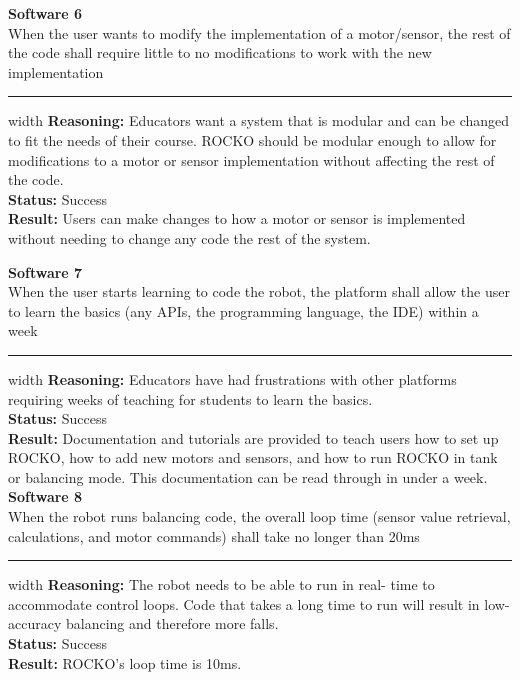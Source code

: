 \documentclass{fank1basedocument}
\begin{document}
{\large \textbf{Software 6}}\\
When the user wants to modify the implementation of a motor/sensor, the rest of the code shall require little to no modifications to work with the new implementation
\hrule width \linewidth
\vspace{2px}
\textbf{Reasoning:} Educators want a system that is modular and can be changed to fit the needs of their course. ROCKO should be modular enough to allow for modifications to a motor or sensor implementation without affecting the rest of the code.\\
\textbf{Status:} \color{ForestGreen}Success\color{black}\\
\textbf{Result:} Users can make changes to how a motor or sensor is implemented without needing to change any code the rest of the system.\\

\pagebreak

{\large \textbf{Software 7}}\\
When the user starts learning to code the robot, the platform shall allow the user to learn the basics (any APIs, the programming language, the IDE) within a week
\hrule width \linewidth
\vspace{2px}
\textbf{Reasoning:} Educators have had frustrations with other platforms requiring weeks of teaching for students to learn the basics.\\
\textbf{Status:} \color{ForestGreen}Success\color{black}\\
\textbf{Result:} Documentation and tutorials are provided to teach users how to set up ROCKO, how to add new motors and sensors, and how to run ROCKO in tank or balancing mode. This documentation can be read through in under a week.\\

{\large \textbf{Software 8}}\\
When the robot runs balancing code, the overall loop time (sensor value retrieval, calculations, and motor commands) shall take no longer than 20ms
\hrule width \linewidth
\vspace{2px}
\textbf{Reasoning:} The robot needs to be able to run in real- time to accommodate control loops. Code that takes a long time to run will result in low-accuracy balancing and therefore more falls.\\
\textbf{Status:} \color{ForestGreen}Success\color{black}\\
\textbf{Result:} ROCKO’s loop time is 10ms.\\
\end{document}

